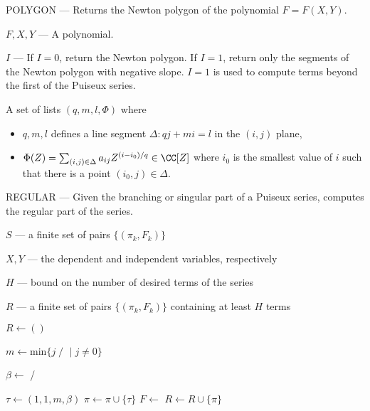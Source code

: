 \begin{algorithm}[h]
\caption{POLYGON --- Returns the Newton polygon of the polynomial $F =
  F(X,Y)$.}
\label{alg: puiseux-polygon}
\begin{algorithmic}[1]
\Input

$F,X,Y$ --- A polynomial.

$I$ --- If $I=0$, return the Newton polygon. If $I=1$, return only the
segments of the Newton polygon with negative slope. $I=1$ is used to
compute terms beyond the first of the Puiseux series.

\Output A set of lists $(q,m,l,\Phi)$ where
\begin{itemize}
  \item $q,m,l$ defines a line segment $\Delta: qj+mi=l$ in the $(i,j)$
    plane,
  \item $\Phi(Z) = \sum_{(i,j)\in\Delta} a_{ij} Z^{(i-i_0)/q} \in
    \CC[Z]$ where $i_0$ is the smallest value of $i$ such that there is
    a point $(i_0,j)\in\Delta$.
\end{itemize}

  \State
\EndFunction
\end{algorithmic}
\end{algorithm}


\begin{algorithm}[h]
\caption{REGULAR --- Given the branching or singular part of a Puiseux
  series, computes the regular part of the series.}
\label{alg: puiseux-regular}
\begin{algorithmic}[1]
\Input

$S$ --- a finite set of pairs $\{(\pi_k,F_k)\}$

$X,Y$ --- the dependent and independent variables, respectively

$H$ --- bound on the number of desired terms of the series

\Output $R$ --- a finite set of pairs $\{(\pi_k,F_k)\}$ containing at
least $H$ terms

  \State $R \leftarrow ()$

      \State $m \leftarrow \text{min} \{ j \; /$
       $ \; | \; j \neq 0 \}$

      \State $\beta \leftarrow$  /

      \State $\tau \leftarrow (1,1,m,\beta)$
      \State $\pi \leftarrow \pi \cup \{\tau\}$
      \State $F \leftarrow$ 
    \EndWhile
    \State $R \leftarrow R \cup \{\pi\}$
  \EndFor
\EndFunction
\end{algorithmic}
\end{algorithm}

